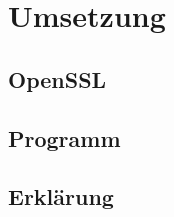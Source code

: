 \newpage
\section{Umsetzung}
\subsection{OpenSSL}

\subsection{Programm}






\subsection{Erklärung}